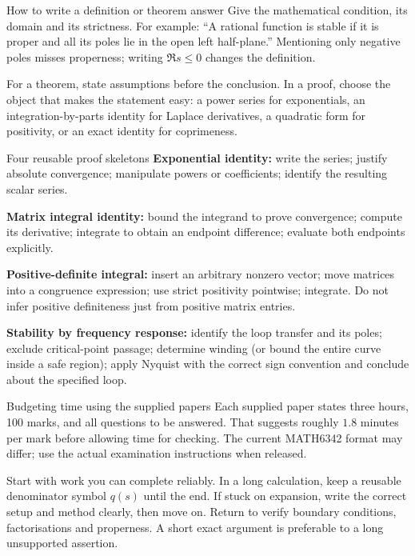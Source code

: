 \begin{method}{How to write a definition or theorem answer}
Give the mathematical condition, its domain and its strictness. For example: ``A rational function is stable if it is proper and all its poles lie in the open left half-plane.'' Mentioning only negative poles misses properness; writing $\Re s\leq0$ changes the definition.

For a theorem, state assumptions before the conclusion. In a proof, choose the object that makes the statement easy: a power series for exponentials, an integration-by-parts identity for Laplace derivatives, a quadratic form for positivity, or an exact identity for coprimeness.
\end{method}
\begin{method}{Four reusable proof skeletons}
\textbf{Exponential identity:} write the series; justify absolute convergence; manipulate powers or coefficients; identify the resulting scalar series.

\textbf{Matrix integral identity:} bound the integrand to prove convergence; compute its derivative; integrate to obtain an endpoint difference; evaluate both endpoints explicitly.

\textbf{Positive-definite integral:} insert an arbitrary nonzero vector; move matrices into a congruence expression; use strict positivity pointwise; integrate. Do not infer positive definiteness just from positive matrix entries.

\textbf{Stability by frequency response:} identify the loop transfer and its poles; exclude critical-point passage; determine winding (or bound the entire curve inside a safe region); apply Nyquist with the correct sign convention and conclude about the specified loop.
\end{method}
\begin{concept}{Budgeting time using the supplied papers}
Each supplied paper states three hours, 100 marks, and all questions to be answered. That suggests roughly $1.8$ minutes per mark before allowing time for checking. The current MATH6342 format may differ; use the actual examination instructions when released.

Start with work you can complete reliably. In a long calculation, keep a reusable denominator symbol $q(s)$ until the end. If stuck on expansion, write the correct setup and method clearly, then move on. Return to verify boundary conditions, factorisations and properness. A short exact argument is preferable to a long unsupported assertion.
\end{concept}
